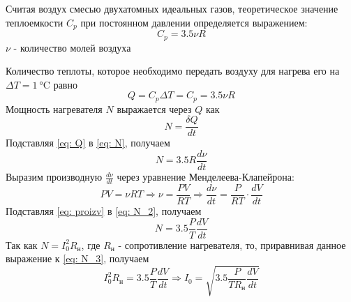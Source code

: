 Считая воздух смесью двухатомных идеальных газов, теоретическое значение теплоемкости $C_p$ при постоянном давлении определяется выражением:
\begin{equation}
    C_p = 3.5\nu R
\end{equation}
$\nu$ - количество молей воздуха

Количество теплоты, которое необходимо передать воздуху для нагрева его на $\Delta T = \SI{1}{\celsius}$ равно
\begin{equation}
    Q = C_p \Delta T = C_p = 3.5\nu R \label{eq: Q}
\end{equation}
Мощность нагревателя $N$ выражается через $Q$ как
\begin{equation}
    N = \frac{\delta Q}{dt} \label{eq: N}
\end{equation}
Подставляя \eqref{eq: Q} в \eqref{eq: N}, получаем
\begin{equation}
    N = 3.5R\frac{d\nu}{dt} \label{eq: N_2}
\end{equation}
Выразим производную $\frac{d\nu}{dt}$ через уравнение Менделеева-Клапейрона:
\begin{equation}
    PV = \nu RT \Rightarrow \nu = \frac{PV}{RT} \Rightarrow \frac{d\nu}{dt} = \frac{P}{RT} \cdot \frac{dV}{dt} \label{eq: proizv}
\end{equation}
Подставляя \eqref{eq: proizv} в \eqref{eq: N_2}, получаем
\begin{equation}
    N = 3.5 \frac{P}{T} \frac{dV}{dt} \label{eq: N_3}
\end{equation}
Так как $N = I_0^2 R_\text{н}$, где $R_\text{н}$ - сопротивление нагревателя, то, приравнивая данное выражение к \eqref{eq: N_3}, получаем
\begin{equation}
    I_0^2 R_\text{н} = 3.5 \frac{P}{T} \frac{dV}{dt} \Rightarrow I_0 = \sqrt{3.5 \frac{P}{TR_\text{н}} \frac{dV}{dt}} \label{eq: I_0}
\end{equation}

